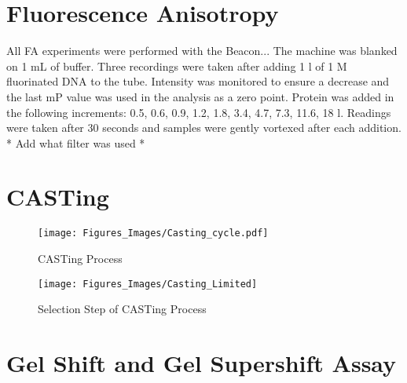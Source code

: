 \documentclass[12pt,twoside]{reedthesis}
\begin{document}
\section{Fluorescence Anisotropy}
All FA experiments were performed with the Beacon... The machine was blanked on 1 mL of buffer. Three recordings were taken after adding 1 \micro l of 1 \micro M fluorinated DNA to the tube. Intensity was monitored to ensure a decrease and the last mP value was used in the analysis as a zero point. Protein was added in the following increments: 0.5, 0.6, 0.9, 1.2, 1.8, 3.4, 4.7, 7.3, 11.6, 18 \micro l. Readings were taken after 30 seconds and samples were gently vortexed after each addition. * Add what filter was used *  

\section{CASTing}

\begin{figure}[[h!tbp]
	\centering
	\texttt{[image: Figures\_Images/Casting\_cycle.pdf]}
	\caption[CASTing Overal Cycle Scheme]{CASTing Process}
	\label{overallcastingscheme}
\end{figure}

\begin{figure}[[h!tbp]
	\centering
	\texttt{[image: Figures\_Images/Casting\_Limited]}
	\caption[CASTing Selection Scheme]{Selection Step of CASTing Process}
	\label{Selectionscheme}
\end{figure}

\clearpage


\section{Gel Shift and Gel Supershift Assay}
\end{document}
